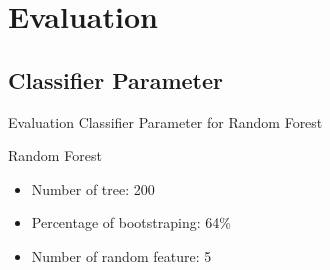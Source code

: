 \documentclass[english]{beamer}
\begin{document}
\section{Evaluation}

\begin{frame}
	\begin{multicols}{2}
		\tableofcontents[currentsection]
	\end{multicols}
\end{frame}


\subsection{Classifier Parameter}

\begin{frame}
	{Evaluation}
	{Classifier Parameter for Random Forest}
	\begin{block}{Random Forest}
		\begin{itemize}
			\item Number of tree: 200
			\item Percentage of bootstraping: 64\%
			\item Number of random feature: 5
		\end{itemize}
	\end{block}
\end{frame}
\end{document}
